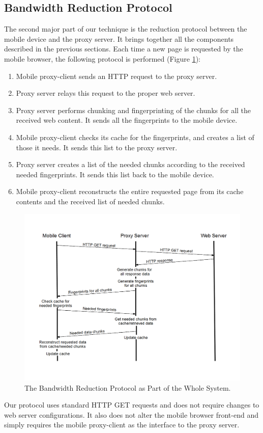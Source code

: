 \subsection{Bandwidth Reduction Protocol}
\label{sec:protocol}
The second major part of our technique is the reduction protocol between the mobile device and the proxy server. It brings together all the components described in the previous sections. Each time a new page is requested by the mobile browser, the following protocol is performed (Figure \ref{fig:protocol}):

\begin{enumerate}
\item Mobile proxy-client sends an HTTP request to the proxy server.
\item Proxy server relays this request to the proper web server.
\item Proxy server performs chunking and fingerprinting of the chunks for all the received web content. It sends all the fingerprints to the mobile device.
\item Mobile proxy-client checks its cache for the fingerprints, and creates a list of those it needs. It sends this list to the proxy server.
\item Proxy server creates a list of the needed chunks according to the received needed fingerprints. It sends this list back to the mobile device.
\item Mobile proxy-client reconstructs the entire requested page from its cache contents and the received list of needed chunks.
\end{enumerate}

\begin{figure}[h] 
\centering \includegraphics[scale=0.40]{images/protocol_diagram.png}
\caption{The Bandwidth Reduction Protocol as Part of the Whole System.}
\label{fig:protocol}
\end{figure}

Our protocol uses standard HTTP GET requests and does not require changes to web server configurations. It also does not alter the mobile browser front-end and simply requires the mobile proxy-client as the interface to the proxy server.







